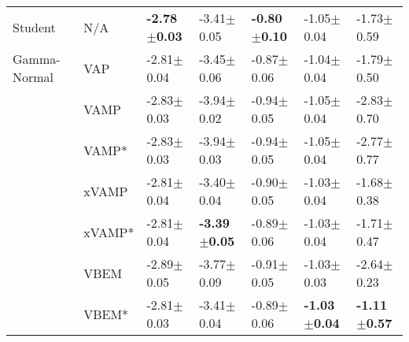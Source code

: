 \begin{tabular}{lllllll}
Student & N/A &  \textbf{-2.78$\pm$0.03} &           -3.41$\pm$0.05 &  \textbf{-0.80$\pm$0.10} &           -1.05$\pm$0.04 &           -1.73$\pm$0.59 \\
Gamma-Normal & VAP &           -2.81$\pm$0.04 &           -3.45$\pm$0.06 &           -0.87$\pm$0.06 &           -1.04$\pm$0.04 &           -1.79$\pm$0.50 \\
             & VAMP &           -2.83$\pm$0.03 &           -3.94$\pm$0.02 &           -0.94$\pm$0.05 &           -1.05$\pm$0.04 &           -2.83$\pm$0.70 \\
             & VAMP* &           -2.83$\pm$0.03 &           -3.94$\pm$0.03 &           -0.94$\pm$0.05 &           -1.05$\pm$0.04 &           -2.77$\pm$0.77 \\
             & xVAMP &           -2.81$\pm$0.04 &           -3.40$\pm$0.04 &           -0.90$\pm$0.05 &           -1.03$\pm$0.04 &           -1.68$\pm$0.38 \\
             & xVAMP* &           -2.81$\pm$0.04 &  \textbf{-3.39$\pm$0.05} &           -0.89$\pm$0.06 &           -1.03$\pm$0.04 &           -1.71$\pm$0.47 \\
             & VBEM &           -2.89$\pm$0.05 &           -3.77$\pm$0.09 &           -0.91$\pm$0.05 &           -1.03$\pm$0.03 &           -2.64$\pm$0.23 \\
             & VBEM* &           -2.81$\pm$0.03 &           -3.41$\pm$0.04 &           -0.89$\pm$0.06 &  \textbf{-1.03$\pm$0.04} &  \textbf{-1.11$\pm$0.57} \\
\bottomrule
\end{tabular}


